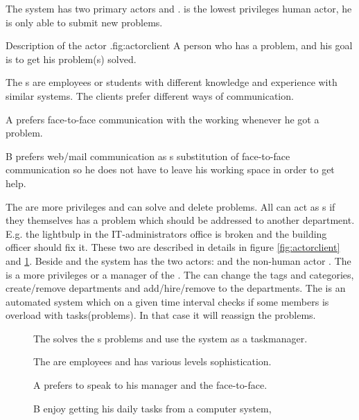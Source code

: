 The system has two primary actors \client{} and \staff. \client[c] is the lowest privileges human actor, he is only able to submit new problems. 

\begin{sadlist}[h]{\Client}{Description of the actor \client.}{fig:actorclient}
 A person who has a problem, and his goal is to get his problem(s) solved.

 The \client{}s are employees or students with different knowledge and experience with similar systems. The clients prefer different ways of communication.%

 \Client{} A prefers face-to-face communication with the working \staff{} whenever he got a problem. 

\client[c] B prefers web/mail communication as s substitution of face-to-face communication so he does not have to leave his working space in order to get help. 

\end{sadlist}


The \staff{} are more privileges and can solve and delete problems. 
All \staff{} can act as \client{}s if they themselves has a problem which should be addressed to another department. 
E.g. the lightbulp in the IT-administrators office is broken and the building officer should fix it. 
These two are described in details in figure \ref{fig:actorclient} and \ref{fig:actorstaff}. 
Beside \staff{} and \client{} the system has the two actors: \sadmin{} and the non-human actor \wmon. 
The \sadmin{} is a more privileges \staff{} or a manager of the \staff. 
The \sadmin{} can change the tags and categories, create/remove departments and add/hire/remove \staff{} to the departments. 
The \wmon[] is an automated system which on a given time interval checks if some \staff{} members is overload with tasks(problems). 
In that case it will reassign the problems.




\begin{figure}[h]

\begin{sadlistar}{\Staff}

 The \staff{} solves the \client[]s problems and use the system as a taskmanager.  

 The \staff[] are employees and has various levels sophistication.

 \staff[c] A prefers to speak to his manager and the \client[] face-to-face.

\staff[c] B enjoy getting his daily tasks from a computer system, 
 \end{sadlistar}
 \caption{}
 \label{fig:actorstaff}
 \end{figure}